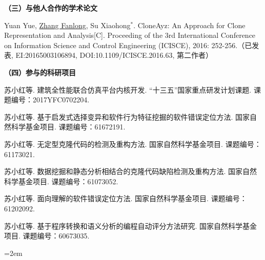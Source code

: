\noindent\textbf{（三）与他人合作的学术论文}
\begin{publist}
\item
Yuan Yue, \underline{Zhang Fanlong},  Su Xiaohong{$^*$}. CloneAyz: An Approach for Clone Representation and Analysis[C]. Proceeding of the 3rd International Conference on Information Science and Control Engineering (ICISCE), 2016: 252-256.（已发表, EI:20165003106894, DOI:10.1109/ICISCE.2016.63, 第二作者）
\end{publist}




\noindent\textbf{（四）参与的科研项目}
\begin{publist}

\item
苏小红等. 建筑全性能联合仿真平台内核开发. “十三五”国家重点研发计划课题. 课题编号：2017YFC0702204.
\item	
苏小红等. 基于启发式选择变异和软件行为特征挖掘的软件错误定位方法. 国家自然科学基金项目. 课题编号：61672191.
\item	
苏小红等. 无定型克隆代码的检测及重构方法. 国家自然科学基金项目. 课题编号：61173021.
\item
苏小红等. 数据挖掘和静态分析相结合的克隆代码缺陷检测及重构方法. 国家自然科学基金项目. 课题编号：61073052.
\item
苏小红等. 面向理解的软件错误定位方法. 国家自然科学基金项目. 课题编号：61202092.

\item
苏小红等. 基于程序转换和语义分析的编程自动评分方法研究. 国家自然科学基金项目. 课题编号：60673035.

\end{publist}
\vfill
{}\hangindent=2em\noindent

\setlength{\parindent}{2em}
